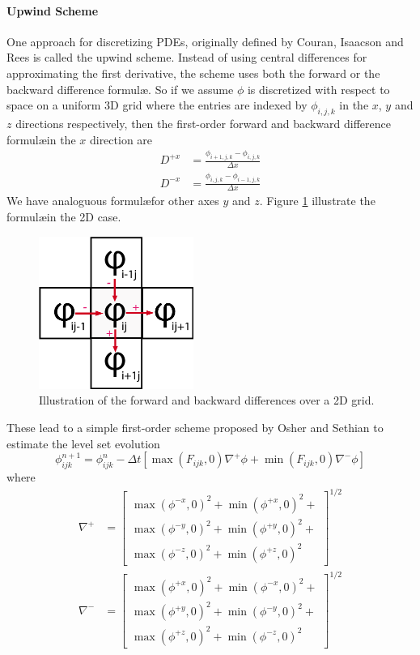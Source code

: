 \documentclass{article}
\begin{document}
\paragraph{Upwind Scheme}
One approach for discretizing PDEs, originally defined by Couran, Isaacson and
Rees \cite{courant1952solution} is called the upwind scheme. Instead of using
central differences for approximating the first derivative, the scheme uses
both the forward or the backward difference formul\ae. So if we assume $\phi$
is discretized with respect to space on a uniform 3D grid where the entries
are indexed by $\phi_{i,j,k}$ in the $x$, $y$ and $z$ directions respectively,
then the first-order forward and backward difference formul\ae\hspace in the $x$
direction are
\begin{align}
  D^{+x} &= \frac{\phi_{i+1,j,k} - \phi_{i,j,k}}{\Delta x} \\
  D^{-x} &= \frac{\phi_{i,j,k} - \phi_{i-1,j,k}}{\Delta x}
\end{align}
We have analoguous formul\ae\hspace for other axes $y$ and $z$. Figure
\ref{fig:fbd} illustrate the formul\ae\hspace in the 2D case.
\begin{figure}
  \centering
  \includegraphics[width=0.45\textwidth]{img/upwind_grid.png}
  \caption{Illustration of the forward and backward differences over a 2D grid.}    
  \label{fig:fbd}
\end{figure}
These lead to a simple first-order scheme proposed by Osher and Sethian
\cite{osher1988fronts} to estimate the level set evolution
\[
\phi^{n+1}_{ijk} = \phi^{n}_{ijk} - \Delta t [ \max(F_{ijk}, 0)  \nabla^{+}\phi
  + \min(F_{ijk},0) \nabla^{-}\phi  ]
\]
where
\begin{align}
  \nabla^{+} & = 
    \begin{bmatrix}
        \max(\phi^{-x}, 0)^2 + \min(\phi^{+x}, 0)^2 + \\
        \max(\phi^{-y}, 0)^2 + \min(\phi^{+y}, 0)^2 + \\
        \max(\phi^{-z}, 0)^2 + \min(\phi^{+z}, 0)^2
    \end{bmatrix}^{1/2}  \\
    \nabla^{-} & = 
    \begin{bmatrix}
        \max(\phi^{+x}, 0)^2 + \min(\phi^{-x}, 0)^2 + \\
        \max(\phi^{+y}, 0)^2 + \min(\phi^{-y}, 0)^2 + \\
        \max(\phi^{+z}, 0)^2 + \min(\phi^{-z}, 0)^2
    \end{bmatrix}^{1/2} 
\end{align}
\end{document}
